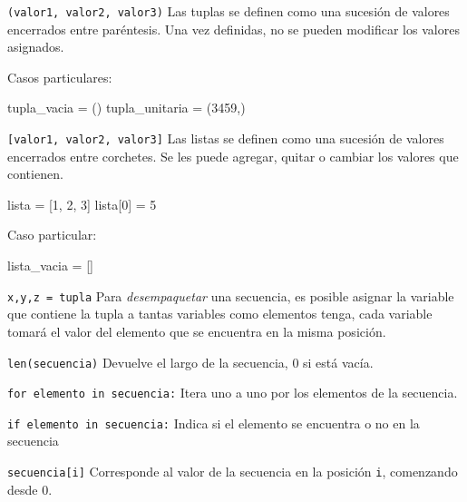 \begin{referencia_python}

\begin{sintaxis}{\lstinline!(valor1, valor2, valor3)!}
Las tuplas se definen como una sucesión de valores encerrados entre
paréntesis. Una vez definidas, no se pueden modificar los valores
asignados.

Casos particulares:
\begin{codigo-python-sn}
tupla_vacia = ()
tupla_unitaria = (3459,)
\end{codigo-python-sn}
\end{sintaxis}

\begin{sintaxis}{\lstinline![valor1, valor2, valor3]!}
Las listas se definen como una sucesión de valores encerrados entre
corchetes.  Se les puede agregar, quitar o cambiar los valores que
contienen.

\begin{codigo-python-sn}
lista = [1, 2, 3]
lista[0] = 5
\end{codigo-python-sn}

Caso particular:
\begin{codigo-python-sn}
lista_vacia = []
\end{codigo-python-sn}
\end{sintaxis}

\begin{sintaxis}{\lstinline!x,y,z = tupla!}
Para {\it desempaquetar} una secuencia, es posible asignar la variable que
contiene la tupla a tantas variables como elementos tenga, cada variable
tomará el valor del elemento que se encuentra en la misma posición.
\end{sintaxis}

\begin{sintaxis}{\lstinline!len(secuencia)!}
Devuelve el largo de la secuencia, 0 si está vacía.
\end{sintaxis}

\begin{sintaxis}{\lstinline!for elemento in secuencia:!}
Itera uno a uno por los elementos de la secuencia.
\end{sintaxis}

\begin{sintaxis}{\lstinline!if elemento in secuencia:!}
Indica si el elemento se encuentra o no en la secuencia
\end{sintaxis}

\begin{sintaxis}{\lstinline!secuencia[i]!}
Corresponde al valor de la secuencia en la posición \lstinline!i!, comenzando
desde 0.


\end{sintaxis}
\end{referencia_python}
